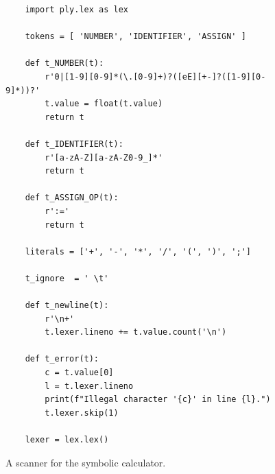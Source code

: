 \begin{figure}[!ht]
\centering
\begin{verbatim}
    import ply.lex as lex
    
    tokens = [ 'NUMBER', 'IDENTIFIER', 'ASSIGN' ]
    
    def t_NUMBER(t):
        r'0|[1-9][0-9]*(\.[0-9]+)?([eE][+-]?([1-9][0-9]*))?'
        t.value = float(t.value)
        return t
    
    def t_IDENTIFIER(t):
        r'[a-zA-Z][a-zA-Z0-9_]*'
        return t
    
    def t_ASSIGN_OP(t):
        r':='
        return t
    
    literals = ['+', '-', '*', '/', '(', ')', ';']
    
    t_ignore  = ' \t'

    def t_newline(t):
        r'\n+'
        t.lexer.lineno += t.value.count('\n')
        
    def t_error(t):
        c = t.value[0]
        l = t.lexer.lineno
        print(f"Illegal character '{c}' in line {l}.")
        t.lexer.skip(1)
    
    lexer = lex.lex()
\end{verbatim}
\vspace*{-0.3cm}
\caption{A scanner for the symbolic calculator.}
\label{fig:Symbolic-Calculator.ipynb:lex}
\end{figure}

